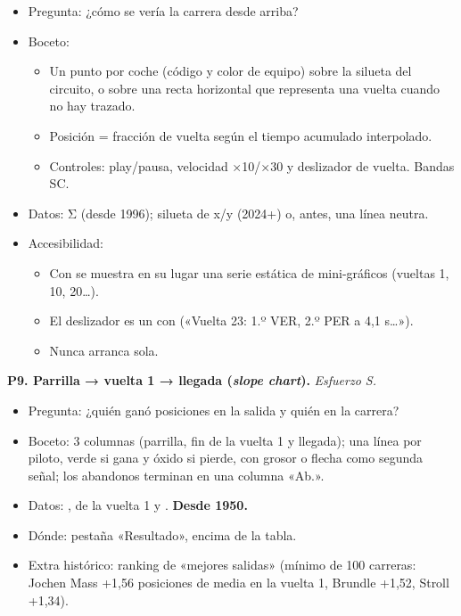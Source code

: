 \begin{itemize}
\item Pregunta: ¿cómo se vería la carrera desde arriba?
\item Boceto:
\begin{itemize}
\item Un punto por coche (código y color de equipo) sobre la silueta del circuito, o sobre una recta horizontal que representa una vuelta cuando no hay trazado.
\item Posición = fracción de vuelta según el tiempo acumulado interpolado.
\item Controles: play/pausa, velocidad ×10/×30 y deslizador de vuelta. Bandas SC.
\end{itemize}
\item Datos: Σ  (desde 1996); silueta de  x/y (2024+) o, antes, una línea neutra.
\item Accesibilidad:
\begin{itemize}
\item Con  se muestra en su lugar una serie estática de mini-gráficos (vueltas 1, 10, 20…).
\item El deslizador es un  con  («Vuelta 23: 1.º VER, 2.º PER a 4,1 s…»).
\item Nunca arranca sola.
\end{itemize}
\end{itemize}

\textbf{P9. Parrilla → vuelta 1 → llegada (\emph{slope chart}).} \emph{Esfuerzo S.}

\begin{itemize}
\item Pregunta: ¿quién ganó posiciones en la salida y quién en la carrera?
\item Boceto: 3 columnas (parrilla, fin de la vuelta 1 y llegada); una línea por piloto, verde si gana y óxido si pierde, con grosor o flecha como segunda señal; los abandonos terminan en una columna «Ab.».
\item Datos: ,  de la vuelta 1 y . \textbf{Desde 1950.}
\item Dónde: pestaña «Resultado», encima de la tabla.
\item Extra histórico: ranking de «mejores salidas» (mínimo de 100 carreras: Jochen Mass +1,56 posiciones de media en la vuelta 1, Brundle +1,52, Stroll +1,34).
\end{itemize}

